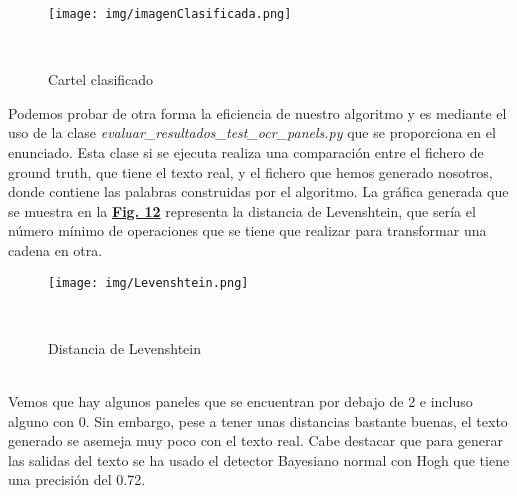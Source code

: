 \documentclass[a4paper, 12pt]{article}
\begin{document}
\begin{figure}[h]
	\centering
	\texttt{[image: img/imagenClasificada.png]}
 	\caption{Cartel clasificado}\
	\label{fig:imagenClasificada}
\end{figure}

Podemos probar de otra forma la eficiencia de nuestro algoritmo y es mediante el uso de la clase \textit{evaluar\_resultados\_test\_ocr\_panels.py} que se proporciona en el enunciado. Esta clase si se ejecuta realiza una comparación entre el fichero de ground truth, que tiene el texto real, y el fichero que hemos generado nosotros, donde contiene las palabras construidas por el algoritmo. La gráfica generada que se muestra en la \textbf{\hyperref[fig:levenshtein]{Fig. 12}} representa la distancia de Levenshtein, que sería el número mínimo de operaciones que se tiene que realizar para transformar una cadena en otra. 
\begin{figure}[h]
	\centering
	\texttt{[image: img/Levenshtein.png]}
	\caption{Distancia de Levenshtein}\
	\label{fig:levenshtein}
\end{figure}
\\Vemos que hay algunos paneles que se encuentran por debajo de 2 e incluso alguno con 0. Sin embargo, pese a tener unas distancias bastante buenas, el texto generado se asemeja muy poco con el texto real. Cabe destacar que para generar las salidas del texto se ha usado el detector Bayesiano normal con Hogh que tiene una precisión del 0.72.
\end{document}
